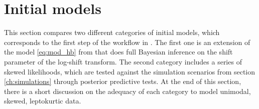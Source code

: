 \section{Initial models}

This section compares two different categories of initial models, which corresponds to the first step of the workflow in \cite{gelman_bayesian_2020}.
The first one is an extension of the model \ref{eq:mod_hb} from \cite{morelli_hierarchical_2021} that does full Bayesian inference on the shift parameter of the log-shift transform.
The second category includes a series of skewed likelihoods, which are tested against the simulation scenarios from section \ref{ch:simulations} through posterior predictive tests.
At the end of this section, there is a short discussion on the adequacy of each category to model unimodal, skewed, leptokurtic data.



